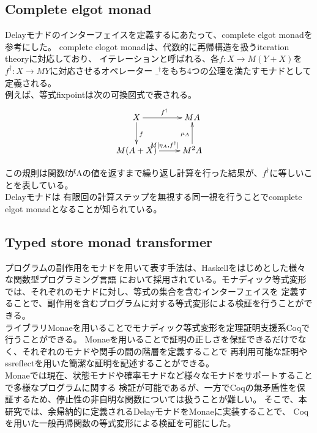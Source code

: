 \documentclass[japanese]{jssst_ppl}
\theoremstyle{definition}
\begin{document}
\subsection{Complete elgot monad}
Delayモナドのインターフェイスを定義するにあたって、complete elgot monadを参考にした。
complete elogot monadは、代数的に再帰構造を扱うiteration theory\cite{ddd}に対応しており、
イテレーションと呼ばれる、各$f : X \rightarrow M (Y + X)$を$f^{\dagger} : X \rightarrow M Y$に対応させるオペレーター
$\_^{\dagger}$をもち4つの公理を満たすモナドとして定義される。\\
例えば、等式fixpointは次の可換図式で表される。
\xymatrixcolsep{2.5cm}
\[
  \xymatrix{
  X \ar[r]^{f^{\dagger}} \ar[d]^{f} & M A  \\
  M (A + X) \ar[r]^{M[\eta_A, f^{\dagger}]}  & M^2 A \ar[u]^{\mu_A}
  }
\]

この規則は関数fがAの値を返すまで繰り返し計算を行った結果が、$f^{\dagger}$に等しいことを表している。\\

Delayモナドは
有限回の計算ステップを無視する同一視を行うことでcomplete elgot monadとなることが知られている\cite{?}。




\subsection{Typed store monad transformer}



\iffalse
  プログラムの副作用をモナドを用いて表す手法は、Haskellをはじめとした様々な関数型プログラミング言語
  において採用されている。モナディック等式変形では、それぞれのモナドに対し、等式の集合を含むインターフェイスを
  定義することで、副作用を含むプログラムに対する等式変形による検証を行うことができる。\\
  ライブラリMonaeを用いることでモナディック等式変形を定理証明支援系Coqで行うことができる。
  Monaeを用いることで証明の正しさを保証できるだけでなく、それぞれのモナドや関手の間の階層を定義することで
  再利用可能な証明やssreflectを用いた簡潔な証明を記述することができる。\\
  Monaeでは現在、状態モナドや確率モナドなど様々なモナドをサポートすることで多様なプログラムに関する
  検証が可能であるが、一方でCoqの無矛盾性を保証するため、停止性の非自明な関数については扱うことが難しい。
  そこで、本研究では、余帰納的に定義されるDelayモナドをMonaeに実装することで、
  Coqを用いた一般再帰関数の等式変形による検証を可能にした。
\end{document}
